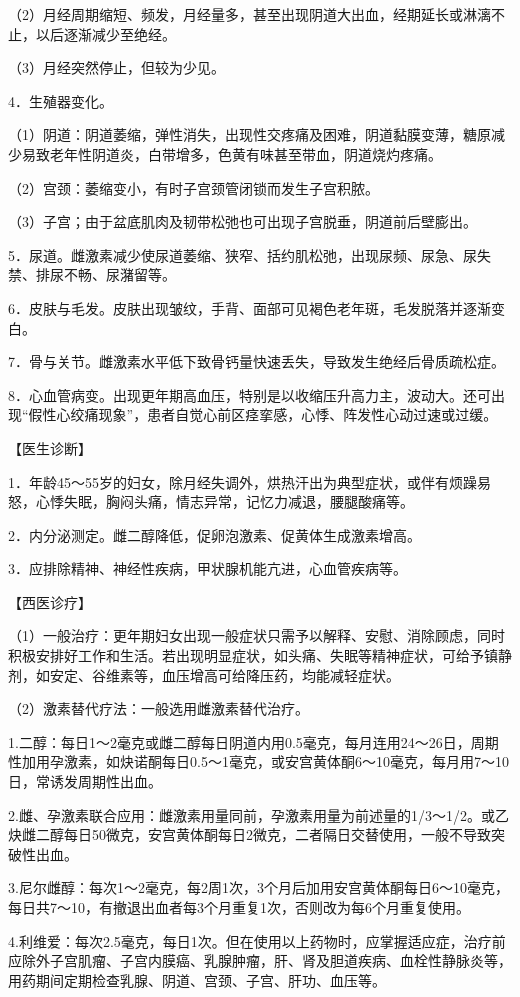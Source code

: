 \documentclass[12pt,UTF8,openany]{ctexbook}
\begin{document}
（2）月经周期缩短、频发，月经量多，甚至出现阴道大出血，经期延长或淋漓不止，以后逐渐减少至绝经。

（3）月经突然停止，但较为少见。

4．生殖器变化。

（1）阴道：阴道萎缩，弹性消失，出现性交疼痛及困难，阴道黏膜变薄，糖原减少易致老年性阴道炎，白带增多，色黄有味甚至带血，阴道烧灼疼痛。

（2）宫颈：萎缩变小，有时子宫颈管闭锁而发生子宫积脓。

（3）子宫；由于盆底肌肉及韧带松弛也可出现子宫脱垂，阴道前后壁膨出。

5．尿道。雌激素减少使尿道萎缩、狭窄、括约肌松弛，出现尿频、尿急、尿失禁、排尿不畅、尿潴留等。

6．皮肤与毛发。皮肤出现皱纹，手背、面部可见褐色老年斑，毛发脱落并逐渐变白。

7．骨与关节。雌激素水平低下致骨钙量快速丢失，导致发生绝经后骨质疏松症。

8．心血管病变。出现更年期高血压，特别是以收缩压升高力主，波动大。还可出现“假性心绞痛现象”，患者自觉心前区痉挛感，心悸、阵发性心动过速或过缓。

【医生诊断】

1．年龄45～55岁的妇女，除月经失调外，烘热汗出为典型症状，或伴有烦躁易怒，心悸失眠，胸闷头痛，情志异常，记忆力减退，腰腿酸痛等。

2．内分泌测定。雌二醇降低，促卵泡激素、促黄体生成激素增高。

3．应排除精神、神经性疾病，甲状腺机能亢进，心血管疾病等。

【西医诊疗】

（1）一般治疗：更年期妇女出现一般症状只需予以解释、安慰、消除顾虑，同时积极安排好工作和生活。若出现明显症状，如头痛、失眠等精神症状，可给予镇静剂，如安定、谷维素等，血压增高可给降压药，均能减轻症状。

（2）激素替代疗法：一般选用雌激素替代治疗。

1.二醇：每日1～2毫克或雌二醇每日阴道内用0.5毫克，每月连用24～26日，周期性加用孕激素，如炔诺酮每日0.5～1毫克，或安宫黄体酮6～10毫克，每月用7～10日，常诱发周期性出血。

2.雌、孕激素联合应用：雌激素用量同前，孕激素用量为前述量的1/3～1/2。或乙炔雌二醇每日50微克，安宫黄体酮每日2微克，二者隔日交替使用，一般不导致突破性出血。

3.尼尔雌醇：每次1～2毫克，每2周1次，3个月后加用安宫黄体酮每日6～10毫克，每日共7～10，有撤退出血者每3个月重复1次，否则改为每6个月重复使用。

4.利维爱：每次2.5毫克，每日1次。但在使用以上药物时，应掌握适应症，治疗前应除外子宫肌瘤、子宫内膜癌、乳腺肿瘤，肝、肾及胆道疾病、血栓性静脉炎等，用药期间定期检查乳腺、阴道、宫颈、子宫、肝功、血压等。
\end{document}
